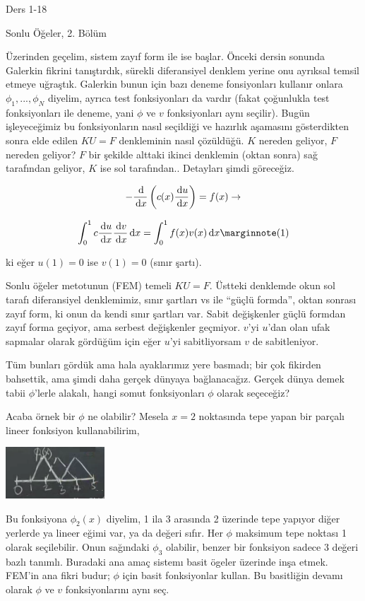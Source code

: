 \documentclass[12pt,fleqn]{article}\usepackage{../../common}
\begin{document}
Ders 1-18

Sonlu Öğeler, 2. Bölüm

Üzerinden geçelim, sistem zayıf form ile ise başlar. Önceki dersin sonunda
Galerkin fikrini tanıştırdık, sürekli diferansiyel denklem yerine onu ayrıksal
temsil etmeye uğraştık. Galerkin bunun için bazı deneme fonsiyonları kullanır
onlara $\phi_1,...,\phi_N$ diyelim, ayrıca test fonksiyonları da vardır (fakat
çoğunlukla test fonksiyonları ile deneme, yani $\phi$ ve $v$ fonksiyonları aynı
seçilir). Bugün işleyeceğimiz bu fonksiyonların nasıl seçildiği ve hazırlık
aşamasını gösterdikten sonra elde edilen $KU = F$ denkleminin nasıl çözüldüğü. $K$
nereden geliyor, $F$ nereden geliyor? $F$ bir şekilde alttaki ikinci denklemin
(oktan sonra) sağ tarafından geliyor, $K$ ise sol tarafından.. Detayları şimdi
göreceğiz.

$$
- \frac{\,\mathrm{d}}{\,\mathrm{d} x} \left( c(x) \frac{\,\mathrm{d} u}{\,\mathrm{d} x} \right) = f(x) \to
$$

$$
\int_{0}^{1} c \frac{\ud u}{\ud x} \frac{\ud v}{\ud x} \ud x =
\int_{0}^{1} f(x) v(x) \ud x
\mlabel{1}
$$

ki eğer $u(1)=0$ ise $v(1) = 0$ (sınır şartı).

Sonlu öğeler metotunun (FEM) temeli $KU = F$. Üstteki denklemde okun sol tarafı
diferansiyel denklemimiz, sınır şartları vs ile ``güçlü formda'', oktan sonrası
zayıf form, ki onun da kendi sınır şartları var. Sabit değişkenler güçlü formdan
zayıf forma geçiyor, ama serbest değişkenler geçmiyor. $v$'yi $u$'dan olan ufak
sapmalar olarak gördüğüm için eğer $u$'yi sabitliyorsam $v$ de sabitleniyor.

Tüm bunları gördük ama hala ayaklarımız yere basmadı; bir çok fikirden
bahsettik, ama şimdi daha gerçek dünyaya bağlanacağız. Gerçek dünya demek tabii
$\phi$'lerle alakalı, hangi somut fonksiyonları $\phi$ olarak seçeceğiz?

Acaba örnek bir $\phi$ ne olabilir? Mesela $x=2$ noktasında tepe yapan bir
parçalı lineer fonksiyon kullanabilirim,

\includegraphics[width=10em]{compscieng_1_18_01.png}

Bu fonksiyona $\phi_2(x)$ diyelim, 1 ila 3 arasında 2 üzerinde tepe yapıyor
diğer yerlerde ya lineer eğimi var, ya da değeri sıfır. Her $\phi$ maksimum tepe
noktası 1 olarak seçilebilir. Onun sağındaki $\phi_3$ olabilir, benzer bir
fonksiyon sadece 3 değeri bazlı tanımlı. Buradaki ana amaç sistemı basit ögeler
üzerinde inşa etmek. FEM'in ana fikri budur; $\phi$ için basit fonksiyonlar
kullan. Bu basitliğin devamı olarak $\phi$ ve $v$ fonksiyonlarını aynı seç.
\end{document}
